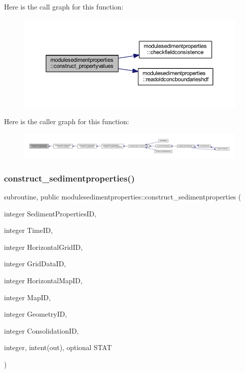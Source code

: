 Here is the call graph for this function\+:\nopagebreak
\begin{figure}[H]
\begin{center}
\leavevmode
\includegraphics[width=350pt]{namespacemodulesedimentproperties_a63773e38287296de2a4e2baec3bfe034_cgraph}
\end{center}
\end{figure}
Here is the caller graph for this function\+:\nopagebreak
\begin{figure}[H]
\begin{center}
\leavevmode
\includegraphics[width=350pt]{namespacemodulesedimentproperties_a63773e38287296de2a4e2baec3bfe034_icgraph}
\end{center}
\end{figure}
\mbox{\label{namespacemodulesedimentproperties_a73be9d7faf93dc6b2994d535213bbd58}} 
\subsubsection{\texorpdfstring{construct\+\_\+sedimentproperties()}{construct\_sedimentproperties()}}
{\footnotesize\ttfamily subroutine, public modulesedimentproperties\+::construct\+\_\+sedimentproperties (\begin{DoxyParamCaption}\item[{integer}]{Sediment\+Properties\+ID,  }\item[{integer}]{Time\+ID,  }\item[{integer}]{Horizontal\+Grid\+ID,  }\item[{integer}]{Grid\+Data\+ID,  }\item[{integer}]{Horizontal\+Map\+ID,  }\item[{integer}]{Map\+ID,  }\item[{integer}]{Geometry\+ID,  }\item[{integer}]{Consolidation\+ID,  }\item[{integer, intent(out), optional}]{S\+T\+AT }\end{DoxyParamCaption})}

